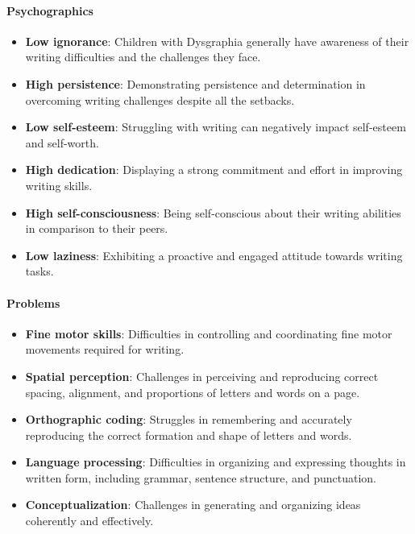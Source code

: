 \paragraph{Psychographics}
\begin{itemize}
    \item \textbf{Low ignorance}: Children with Dysgraphia generally have awareness of their writing difficulties and the challenges they face.
    \item \textbf{High persistence}: Demonstrating persistence and determination in overcoming writing challenges despite all the setbacks.
    \item \textbf{Low self-esteem}: Struggling with writing can negatively impact self-esteem and self-worth.
    \item \textbf{High dedication}: Displaying a strong commitment and effort in improving writing skills.
    \item \textbf{High self-consciousness}: Being self-conscious about their writing abilities in comparison to their peers.
    \item \textbf{Low laziness}: Exhibiting a proactive and engaged attitude towards writing tasks.
\end{itemize}

\paragraph{Problems}
\begin{itemize}
    \item \textbf{Fine motor skills}: Difficulties in controlling and coordinating fine motor movements required for writing.
    \item \textbf{Spatial perception}: Challenges in perceiving and reproducing correct spacing, alignment, and proportions of letters and words on a page.
    \item \textbf{Orthographic coding}: Struggles in remembering and accurately reproducing the correct formation and shape of letters and words.
    \item \textbf{Language processing}: Difficulties in organizing and expressing thoughts in written form, including grammar, sentence structure, and punctuation.
    \item \textbf{Conceptualization}: Challenges in generating and organizing ideas coherently and effectively.
\end{itemize}

